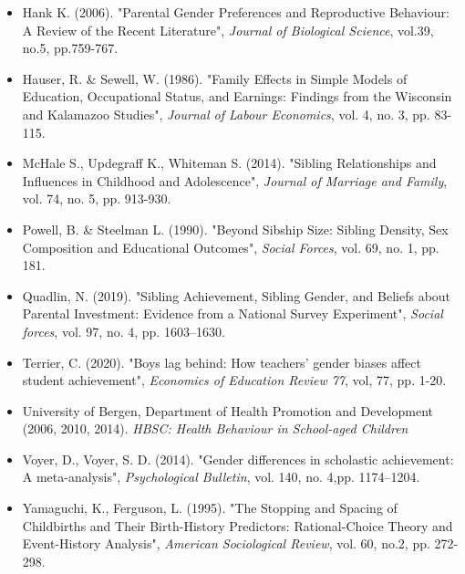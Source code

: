 \documentclass[12pt]{article}
\begin{document}
\begin{itemize}
    \item Hank K. (2006). "Parental Gender Preferences and Reproductive Behaviour: A Review of the Recent Literature", \textit{Journal of Biological Science}, vol.39, no.5, pp.759-767.
    \item Hauser, R. \& Sewell, W. (1986). "Family Effects in Simple Models of Education, Occupational Status, and Earnings: Findings from the Wisconsin and Kalamazoo Studies", \textit{Journal of Labour Economics}, vol. 4, no. 3, pp. 83-115.
    \item McHale S., Updegraff K., Whiteman S. (2014). "Sibling Relationships and Influences in Childhood and Adolescence", \textit{Journal of Marriage and Family}, vol. 74, no. 5, pp. 913-930.
    \item Powell, B. \& Steelman L. (1990). "Beyond Sibship Size: Sibling Density, Sex Composition and Educational Outcomes", \textit{Social Forces}, vol. 69, no. 1, pp. 181.
    \item Quadlin, N. (2019). "Sibling Achievement, Sibling Gender, and Beliefs about Parental Investment: Evidence from a National Survey Experiment", \textit{Social forces}, vol. 97, no. 4, pp. 1603–1630.
    \item Terrier, C. (2020). "Boys lag behind: How teachers’ gender biases affect student achievement", \textit{Economics of Education Review 77}, vol, 77, pp. 1-20.
    \item University of Bergen, Department of Health Promotion and Development (2006, 2010, 2014). \textit{HBSC: Health Behaviour in School-aged Children} 
    \item Voyer, D., Voyer, S. D. (2014). "Gender differences in scholastic achievement: A meta-analysis", \textit{Psychological Bulletin}, vol. 140, no. 4,pp. 1174–1204.
    \item Yamaguchi, K., Ferguson, L. (1995). "The Stopping and Spacing of Childbirths and Their Birth-History Predictors: Rational-Choice Theory and Event-History Analysis", \textit{American Sociological Review}, vol. 60, no.2, pp. 272-298.

\end{itemize}
\end{document}
